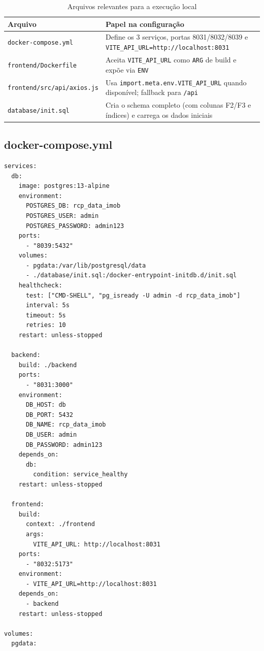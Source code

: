 \documentclass[12pt, a4paper]{article}
\newcommand{\thead}[1]{\cellcolor{tableheader}\color{white}\bfseries #1}
\newcommand{\talt}{\rowcolor{tablerowalt}}
\begin{document}
\begin{table}[H]
\centering
\begin{tabularx}{\textwidth}{|l|X|}
\hline
\thead{Arquivo} & \thead{Papel na configuração} \\
\hline
\texttt{docker-compose.yml}          & Define os 3 serviços, portas 8031/8032/8039 e \texttt{VITE\_API\_URL=http://localhost:8031} \\
\talt \texttt{frontend/Dockerfile}       & Aceita \texttt{VITE\_API\_URL} como \texttt{ARG} de build e expõe via \texttt{ENV} \\
\texttt{frontend/src/api/axios.js}   & Usa \texttt{import.meta.env.VITE\_API\_URL} quando disponível; fallback para \texttt{/api} \\
\talt \texttt{database/init.sql}         & Cria o schema completo (com colunas F2/F3 e índices) e carrega os dados iniciais \\
\hline
\end{tabularx}
\caption{Arquivos relevantes para a execução local}
\end{table}

\subsection{docker-compose.yml}

\begin{lstlisting}[language=YAML2]
services:
  db:
    image: postgres:13-alpine
    environment:
      POSTGRES_DB: rcp_data_imob
      POSTGRES_USER: admin
      POSTGRES_PASSWORD: admin123
    ports:
      - "8039:5432"
    volumes:
      - pgdata:/var/lib/postgresql/data
      - ./database/init.sql:/docker-entrypoint-initdb.d/init.sql
    healthcheck:
      test: ["CMD-SHELL", "pg_isready -U admin -d rcp_data_imob"]
      interval: 5s
      timeout: 5s
      retries: 10
    restart: unless-stopped

  backend:
    build: ./backend
    ports:
      - "8031:3000"
    environment:
      DB_HOST: db
      DB_PORT: 5432
      DB_NAME: rcp_data_imob
      DB_USER: admin
      DB_PASSWORD: admin123
    depends_on:
      db:
        condition: service_healthy
    restart: unless-stopped

  frontend:
    build:
      context: ./frontend
      args:
        VITE_API_URL: http://localhost:8031
    ports:
      - "8032:5173"
    environment:
      - VITE_API_URL=http://localhost:8031
    depends_on:
      - backend
    restart: unless-stopped

volumes:
  pgdata:
\end{lstlisting}
\end{document}
